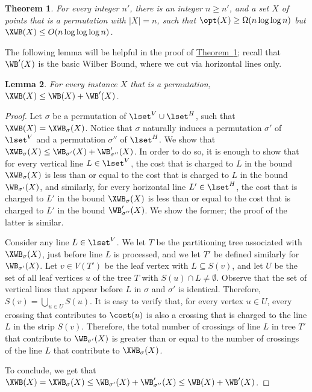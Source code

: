 \documentclass[11pt]{article}
\numberwithin{equation}{section}
\newtheorem{theorem}{Theorem}[section]
\newtheorem{lemma}[theorem]{Lemma}
\theoremstyle{definition}
\theoremstyle{plain}
\newcommand{\expref}[2]{\hyperref[#2]{#1~\ref{#2}}}
\begin{document}
%


\begin{theorem}
	\label{thm:negative for XWB}
	For every integer $n'$, there is an integer $n\geq n'$, and a set $X$ of points that is a permutation with $|X|=n$, such that $\opt(X)\geq \Omega(n\log\log n)$ but $\XWB(X)\leq O(n\log\log\log n)$.
\end{theorem}


%

%
%

The following lemma will be helpful in the proof of \expref{Theorem}{thm:negative for XWB}; recall that $\WB'(X)$ is the basic Wilber Bound, where we cut via horizontal lines only.

\begin{lemma}\label{lem: extended WB from vertical and horizontal}
	For every instance $X$ that is a permutation, $\XWB(X)\leq \WB(X)+\WB'(X)$.
\end{lemma}

\begin{proof}
	Let $\sigma$ be a permutation of $\lset^V\cup \lset^H$, such that $\XWB(X)=\XWB_{\sigma}(X)$. Notice that $\sigma$ naturally induces a permutation $\sigma'$ of $\lset^V$ and a permutation $\sigma''$ of $\lset^H$. We show that $\XWB_{\sigma}(X)\leq \WB_{\sigma'}(X)+\WB'_{\sigma''}(X)$. In order to do so, it is enough to show that for every vertical line $L\in \lset^V$, the cost that is charged to $L$ in the bound $\XWB_{\sigma}(X)$ is less than or equal to the cost that is charged to $L$ in the bound $\WB_{\sigma'}(X)$, and similarly, for every horizontal line $L'\in \lset^H$, the cost that is charged to $L'$ in the bound $\XWB_{\sigma}(X)$ is less than or equal to the cost that is charged to $L'$ in the bound $\WB'_{\sigma''}(X)$. We show the former; the proof of the latter is similar.
	
	Consider any line $L\in \lset^V$. We let $T$ be the partitioning tree associated with $\XWB_{\sigma}(X)$, just before line $L$ is processed, and we let $T'$ be defined similarly for $\WB_{\sigma'}(X)$. Let $v\in V(T')$ be the leaf vertex with $L\subseteq S(v)$, and let $U$ be the set of all leaf vertices $u$ of the tree $T$ with $S(u)\cap L\neq \emptyset$. Observe that the set of vertical lines that appear before $L$ in $\sigma$ and $\sigma'$ is identical. Therefore, $S(v)=\bigcup_{u\in U}S(u)$. It is easy to verify that, for every vertex $u\in U$, every crossing that contributes to $\cost(u)$ is also a crossing that is charged to the line $L$ in the strip $S(v)$. Therefore, the total number of crossings of line $L$ in tree $T'$ that contribute to $\WB_{\sigma'}(X)$ is greater than or equal to the number of crossings of the line $L$ that contribute to $\XWB_{\sigma}(X)$.
	
	To conclude, we get that $\XWB(X)=\XWB_{\sigma}(X)\leq \WB_{\sigma'}(X)+\WB'_{\sigma''}(X)\leq \WB(X)+\WB'(X)$.
\end{proof}
 
\end{document}
